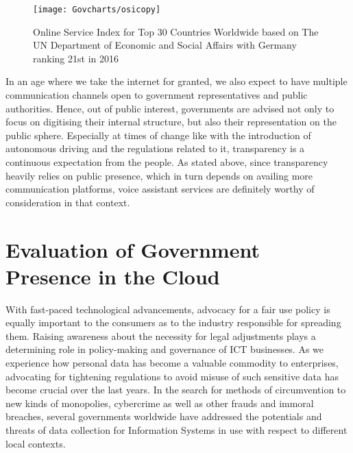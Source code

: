 \begin{figure}[h]
	\centering
	\caption[United Nations Online Service Index (Top 30)]{Online Service Index for Top 30 Countries Worldwide based on The UN Department of Economic and Social Affairs \cite{un:egovReport} with Germany ranking 21st in 2016}
	\label{un:osi}
	\texttt{[image: Govcharts/osicopy]} 
\end{figure}

In an age where we take the internet for granted,
we also expect to have multiple communication channels open to government representatives and public authorities. 
%
Hence, out of public interest, governments are advised not only to focus on digitising their internal structure, but also their representation on the public sphere.
Especially at times of change like with the introduction of autonomous driving and the regulations related to it, transparency is a continuous expectation from the people. As stated above, since transparency heavily relies on public presence, which in turn depends on availing more communication platforms, voice assistant services are definitely worthy of consideration in that context.


\section{Evaluation of Government Presence in the Cloud}
With fast-paced technological advancements, advocacy for a fair use policy is equally important to the consumers as to the industry responsible for spreading them. Raising awareness about the necessity for legal adjustments %
plays a determining role in policy-making and governance of ICT businesses. As we experience how personal data has become a valuable commodity to enterprises, advocating for tightening regulations to avoid misuse of such sensitive data has become crucial over the last years. In the search for methods of circumvention to new kinds of monopolies, cybercrime as well as other frauds and immoral breaches, several governments worldwide have addressed the potentials and threats of data collection for Information Systems in use with respect to different local contexts. 





